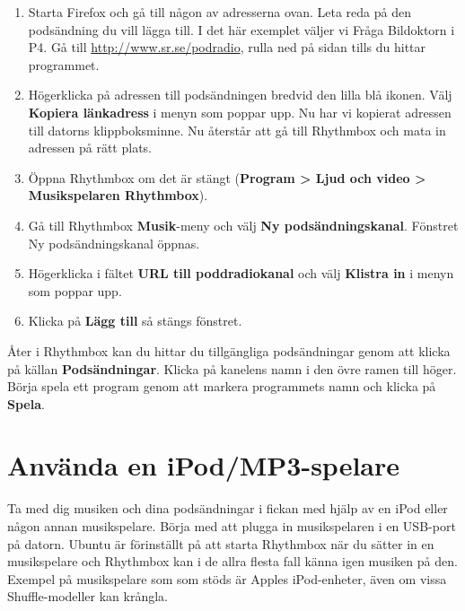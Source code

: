 \documentclass[a4paper,final]{memoir} %
\begin{document}
\begin{enumerate}

\item Starta Firefox och gå till någon av adresserna ovan. Leta reda på den podsändning du vill lägga till. I det här exemplet väljer vi Fråga Bildoktorn i P4. Gå till \url{http://www.sr.se/podradio}, rulla ned på sidan tills du hittar programmet.

\item Högerklicka på adressen till podsändningen bredvid den lilla blå ikonen. Välj \textbf{Kopiera länkadress} i menyn som poppar upp. Nu har vi kopierat adressen till datorns klippboksminne. Nu återstår att gå till Rhythmbox och mata in adressen på rätt plats.

\item Öppna Rhythmbox om det är stängt (\textbf{Program \textgreater{} Ljud och video \textgreater{} Musikspelaren Rhythmbox}). 

\item Gå till Rhythmbox \textbf{Musik}-meny och välj \textbf{Ny podsändningskanal}. Fönstret Ny podsändningskanal öppnas. 

\item Högerklicka i fältet \textbf{URL till poddradiokanal} och välj \textbf{Klistra in} i menyn som poppar upp. 

\item Klicka på \textbf{Lägg till} så stängs fönstret. 

\end{enumerate}

Åter i Rhythmbox kan du hittar du tillgängliga podsändningar genom att klicka på källan \textbf{Podsändningar}. Klicka på kanelens namn i den övre ramen till höger. Börja spela ett program genom att markera programmets namn och klicka på \textbf{Spela}.



\section{Använda en iPod/MP3-spelare}

Ta med dig musiken och dina podsändningar i fickan med hjälp av en iPod eller någon annan musikspelare. 
Börja med att plugga in musikspelaren i en USB-port på datorn. Ubuntu är förinställt på att starta Rhythmbox när du sätter in en musikspelare och Rhythmbox kan i de allra flesta fall känna igen musiken på den. Exempel på musikspelare som som stöds är Apples iPod-enheter, även om vissa Shuffle-modeller kan krångla. 
\end{document}
